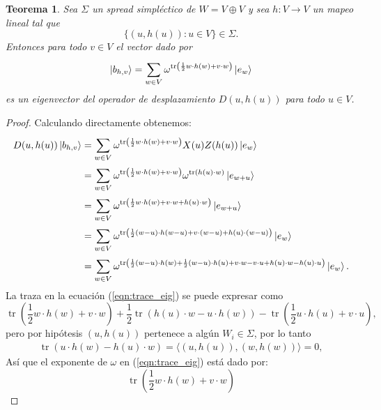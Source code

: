 \documentclass[a4paper]{report}
\DeclareMathOperator{\tr}{tr}
\newtheorem{theorem}{Teorema}
\begin{document}
  \begin{theorem}
    Sea $\Sigma$ un spread simpléctico de $W = V \oplus V$ y
    sea $h : V \to V$ un mapeo lineal tal que
    \[
      \{(u,h(u)) : u \in V\} \in \Sigma.
    \]
    Entonces para todo $v \in V$ el vector dado por
    \[
      \ket{b_{h,v}}
      = \sum_{w \in V}^{} \omega^{\tr\left( \frac{1}{2} w
      \cdot h(w) + v \cdot w \right) } \ket{e_w}
    \] 
    es un eigenvector del operador de desplazamiento
    $D(u,h(u))$ para todo $u \in V$.
  \end{theorem}
  \begin{proof}
    Calculando directamente obtenemos:
    \begin{align}
      D(u,h(u)) \ket{b_{h,v}}
      &= \sum_{w \in V}^{} \omega^{\tr\left( \frac{1}{2} w
      \cdot h(w) + v \cdot w \right) } X(u)Z(h(u)) \ket{e_w}
      \\
      &= \sum_{w \in V}^{} \omega^{\tr\left( \frac{1}{2} w
      \cdot h(w) + v \cdot w \right) } \omega^{\tr(h(u)
      \cdot w)} \ket{e_{w+u}} \\
      &= \sum_{w \in V}^{} \omega^{\tr\left( \frac{1}{2} w
      \cdot h(w) + v \cdot w + h(u) \cdot w \right) }
      \ket{e_{w+u}} \\
      &= \sum_{w \in V}^{} \omega^{\tr\left( \frac{1}{2}
      (w-u) \cdot h(w-u) + v \cdot (w-u) + h(u) \cdot (w-u)
      \right) } \ket{e_w} \\
      &= \sum_{w \in V}^{} \omega^{\tr\left(
      \frac{1}{2}(w-u) \cdot h(w) + \frac{1}{2}(w-u) \cdot
      h(u) + v \cdot w - v \cdot u + h(u) \cdot w - h(u) \cdot u
      \right) } \ket{e_w} \label{eqn:trace_eig}.
    \end{align}
    La traza en la ecuación (\ref{eqn:trace_eig}) se puede
    expresar como
    \begin{equation}
      \tr\left( \frac{1}{2} w \cdot h(w) + v \cdot w
      \right) + \frac{1}{2}\tr\left( h(u) \cdot w - u \cdot
      h(w) \right) - \tr\left( \frac{1}{2} u \cdot h(u) + v
      \cdot u\right),
    \end{equation}
    pero por hipótesis $(u,h(u))$ pertenece a algún $W_i \in
    \Sigma$, por lo tanto
    \begin{align}
      \tr\left( u \cdot h(w) - h(u) \cdot w \right)
      = \langle (u,h(u)), (w,h(w)) \rangle
      = 0,
    \end{align}
    Así que el exponente de $\omega$ en
    (\ref{eqn:trace_eig}) está dado por: 
    \begin{equation}
      \tr\left( \frac{1}{2} w \cdot h(w) + v \cdot w \right)

\end{equation}
\end{proof}
\end{document}

